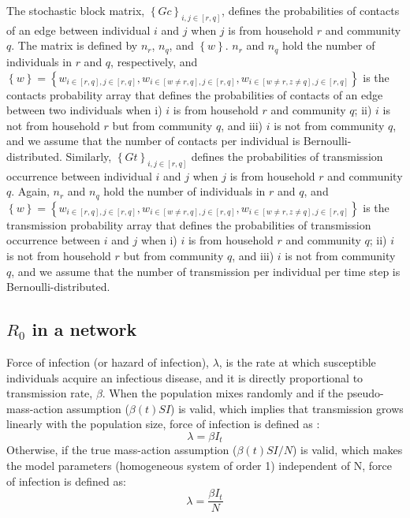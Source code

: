 \documentclass[a4paper]{article}
\begin{document}
	The stochastic block matrix, $\left \{Gc \right \}_{i,j\in [r,q]}$, defines the probabilities of contacts of an edge between individual $i$ and $j$ when $j$ is from household $r$ and community $q$. The matrix is defined by $n_r$, $n_q$, and $\left \{w \right \}$. $n_r$ and $n_q$ hold the number of individuals in $r$ and $q$, respectively, and $\left \{w \right \}=\left \{w_{i\in [r,q],j\in [r,q]}, w_{i\in [w\neq r,q],j\in [r,q]}, w_{i\in [w\neq r,z\neq q],j\in [r,q]} \right \}$ is the contacts probability array that defines the probabilities of contacts of an edge between two individuals when i) $i$ is from household $r$ and community $q$; ii) $i$ is not from household $r$ but from community $q$, and iii) $i$ is not from community $q$, and we assume that the number of contacts per individual is Bernoulli-distributed. Similarly, $\left \{Gt \right \}_{i,j\in [r,q]}$ defines the probabilities of transmission occurrence between individual $i$ and $j$ when $j$ is from household $r$ and community $q$. Again, $n_r$ and $n_q$ hold the number of individuals in $r$ and $q$, and $\left \{w \right \}=\left \{w_{i\in [r,q],j\in [r,q]}, w_{i\in [w\neq r,q],j\in [r,q]}, w_{i\in [w\neq r,z\neq q],j\in [r,q]} \right \}$ is the transmission probability array that defines the probabilities of transmission occurrence between $i$ and $j$ when i) $i$ is from household $r$ and community $q$; ii) $i$ is not from household $r$ but from community $q$, and iii) $i$ is not from community $q$, and we assume that the number of transmission per individual per time step is Bernoulli-distributed. 
	
	\subsection{$R_0$ in a network}
	Force of infection (or hazard of infection), $\lambda$, is the rate at which susceptible individuals acquire an infectious disease, and it is directly proportional to transmission rate, $\beta$. When the population mixes randomly and if the pseudo-mass-action assumption ($\beta(t)SI$) is valid, which implies that transmission grows linearly with the population size, force of infection is defined as \cite{vandenDriessche2017InfectDisModel}:
	\begin{equation}
	\lambda = \beta I_t
	\end{equation}
	Otherwise, if the true mass-action assumption ($\beta(t)SI/N$) is valid, which makes the model parameters (homogeneous system of order 1) independent of N, force of infection is defined as:
	\begin{equation}
	\lambda = \frac{\beta I_t}{N}
	\end{equation}
	
\end{document}
